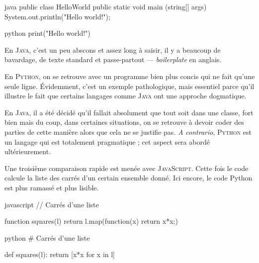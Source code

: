 \begin{jazzcode*}
\caption{\label{code:X.2}Comparaison d'un programme « \emph{Hello world!} » en \textsc{Java} et en \textsc{Python}.}
\begin{codebox}[width=0.45\linewidth, nobeforeafter]{java}
public class HelloWorld
{
	public static void main (string[] args)
	{
		System.out.println("Hello world!");
	}
}
\end{codebox}
\qquad\quad %
\begin{codebox}[width=0.265\linewidth, nobeforeafter]{python}
print("Hello world!")
\end{codebox}
\end{jazzcode*}

En \textsc{Java}, c'est un peu abscons et assez long à saisir, il y a beaucoup de bavardage, de texte standard et passe-partout --- \textit{boilerplate} en anglais.


En \textsc{Python}, on se retrouve avec un programme bien plus concis qui ne fait qu'une seule ligne. 
Évidemment, c'est un exemple pathologique, mais essentiel parce qu'il illustre le fait que certains langages comme \textsc{Java} ont une approche dogmatique.

En \textsc{Java}, il a été décidé qu'il fallait absolument que tout soit dans une classe, fort bien mais du coup, dans certaines situations, on se retrouve à devoir coder des parties de cette manière alors que cela ne se justifie pas. \textit{A contrario}, \textsc{Python} est un langage qui est totalement pragmatique ; cet aspect sera abordé ultérieurement.

Une troisième comparaison rapide est menée avec \textsc{JavaScript}. Cette fois le code calcule la liste des carrés d'un certain ensemble donné. Ici encore, le code Python est plus ramassé et plus lisible.

\begin{jazzcode*}
\caption{\label{code:X.3}Codage du carré des éléments d'une liste en \textsc{JavaScript} et en \textsc{Python}.}
\begin{codebox}[width=0.45\linewidth, nobeforeafter]{javascript}
// Carrés d'une liste

function squares(l) {
	return l.map(function(x) {return x*x;})
}
\end{codebox}
\qquad\quad %
\begin{codebox}[width=0.3\linewidth, nobeforeafter]{python}
# Carrés d'une liste

def squares(l):
	return [x*x for x in l]
\end{codebox}
\end{jazzcode*}

